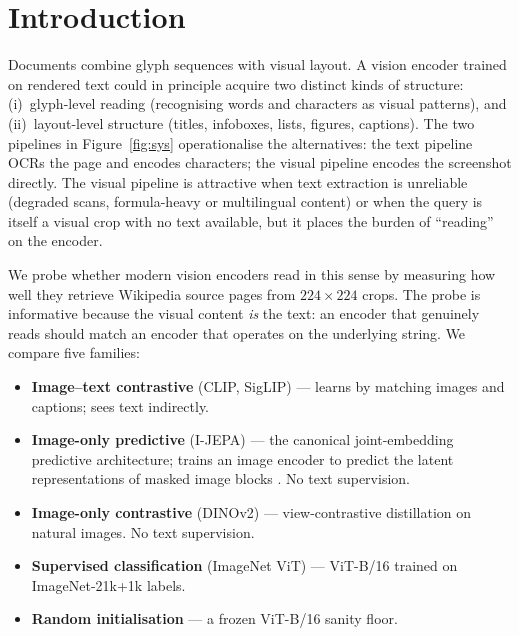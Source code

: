 \documentclass{article}
\begin{document}
\section{Introduction}
\label{sec:intro}

Documents combine glyph sequences with visual layout. A vision
encoder trained on rendered text could in principle acquire two
distinct kinds of structure: (i)~glyph-level reading (recognising
words and characters as visual patterns), and (ii)~layout-level
structure (titles, infoboxes, lists, figures, captions). The two
pipelines in Figure~\ref{fig:sys} operationalise the alternatives:
the text pipeline OCRs the page and encodes characters; the visual
pipeline encodes the screenshot directly. The visual pipeline is
attractive when text extraction is unreliable (degraded scans,
formula-heavy or multilingual content) or when the query is itself
a visual crop with no text available, but it places the burden of
``reading'' on the encoder.

We probe whether modern vision encoders read in this sense by
measuring how well they retrieve Wikipedia source pages from
$224{\times}224$ crops. The probe is informative because the visual
content \emph{is} the text: an encoder that genuinely reads should
match an encoder that operates on the underlying string. We compare
five families:

\begin{itemize}
\item \textbf{Image--text contrastive} (CLIP, SigLIP) --- learns by
matching images and captions; sees text indirectly.
\item \textbf{Image-only predictive} (I-JEPA) --- the canonical
joint-embedding predictive architecture; trains an image encoder
to predict the latent representations of masked image blocks
\cite{assran2023ijepa}. No text supervision.
\item \textbf{Image-only contrastive} (DINOv2) --- view-contrastive
distillation on natural images. No text supervision.
\item \textbf{Supervised classification} (ImageNet ViT) --- ViT-B/16
trained on ImageNet-21k+1k labels.
\item \textbf{Random initialisation} --- a frozen ViT-B/16 sanity
floor.
\end{itemize}
\end{document}
